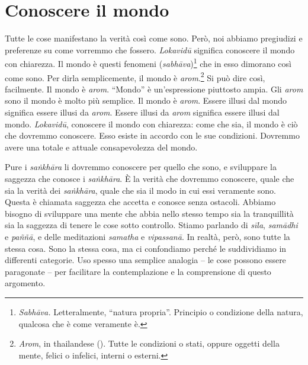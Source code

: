 \chapter{Conoscere il mondo}

\enlargethispage{-\baselineskip}

Tutte le cose manifestano la verità così come sono. Però, noi abbiamo
pregiudizi e preferenze su come vorremmo che fossero. \emph{Lokavidū}
significa conoscere il mondo con chiarezza. Il mondo è questi fenomeni
(\emph{sabhāva})\footnote{\emph{Sabhāva.} Letteralmente, ``natura
  propria''. Principio o condizione della natura, qualcosa che è come
  veramente è.} che in esso dimorano così come sono. Per dirla
semplicemente, il mondo è \emph{arom}.\footnote{\emph{Arom}, in
  thailandese (). Tutte le condizioni o stati, oppure oggetti
  della mente, felici o infelici, interni o esterni.} Si può dire così,
facilmente. Il mondo è \emph{arom}. ``Mondo'' è un'espressione piuttosto
ampia. Gli \emph{arom} sono il mondo è molto più semplice. Il mondo è
\emph{arom}. Essere illusi dal mondo significa essere illusi da
\emph{arom}. Essere illusi da \emph{arom} significa essere illusi dal
mondo. \emph{Lokavidū}, conoscere il mondo con chiarezza: come che sia,
il mondo è ciò che dovremmo conoscere. Esso esiste in accordo con le sue
condizioni. Dovremmo avere una totale e attuale consapevolezza del
mondo.

Pure i \emph{saṅkhāra} li dovremmo conoscere per quello che sono, e
sviluppare la saggezza che conosce i \emph{saṅkhāra}. È la verità che
dovremmo conoscere, quale che sia la verità dei \emph{saṅkhāra}, quale
che sia il modo in cui essi veramente sono. Questa è chiamata saggezza
che accetta e conosce senza ostacoli. Abbiamo bisogno di sviluppare una
mente che abbia nello stesso tempo sia la tranquillità sia la saggezza
di tenere le cose sotto controllo. Stiamo parlando di \emph{sīla},
\emph{samādhi} e \emph{paññā}, e delle meditazioni \emph{samatha} e
\emph{vipassanā}. In realtà, però, sono tutte la stessa cosa. Sono la
stessa cosa, ma ci confondiamo perché le suddividiamo in differenti
categorie. Uso spesso una semplice analogia -- le cose possono essere
paragonate -- per facilitare la contemplazione e la comprensione di
questo argomento.

